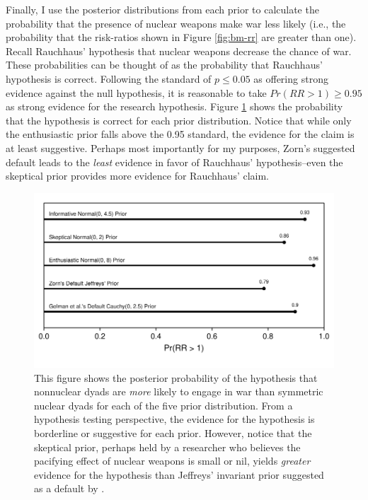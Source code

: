\documentclass[12pt]{article}
\begin{document}
Finally, I use the posterior distributions from each prior to calculate the probability that the presence of nuclear weapons make war less likely (i.e., the probability that the risk-ratios shown in Figure \ref{fig:bm-rr} are greater than one). 
Recall Rauchhaus' hypothesis that nuclear weapons decrease the chance of war. 
These probabilities can be thought of as the probability that Rauchhaus' hypothesis is correct. 
Following the standard of $p \leq 0.05$ as offering strong evidence against the null hypothesis, it is reasonable to take $Pr(RR > 1) \geq 0.95$ as strong evidence for the research hypothesis. 
Figure \ref{fig:bm-pr-hypothesis} shows the probability that the hypothesis is correct for each prior distribution. 
Notice that while only the enthusiastic prior falls above the 0.95 standard, the evidence for the claim is at least suggestive. 
Perhaps most importantly for my purposes, Zorn's suggested default leads to the \emph{least} evidence in favor of Rauchhaus' hypothesis--even the skeptical prior provides more evidence for Rauchhaus' claim.

\begin{figure}[H]
\begin{center}
\includegraphics[scale = .8]{figs/bm-pr-hypothesis.pdf}
\caption{This figure shows the posterior probability of the hypothesis that nonnuclear dyads are \emph{more} likely to engage in war than symmetric nuclear dyads for each of the five prior distribution. 
From a hypothesis testing perspective, the evidence for the hypothesis is borderline or suggestive for each prior. 
However, notice that the skeptical prior, perhaps held by a researcher who believes the pacifying effect of nuclear weapons is small or nil, yields \emph{greater} evidence for the hypothesis than Jeffreys' invariant prior suggested as a default by \cite{Zorn2005}.}\label{fig:bm-pr-hypothesis}
\end{center}
\end{figure}
\end{document}
